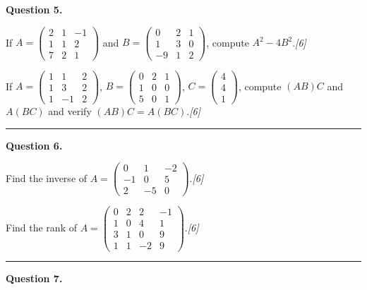 \documentclass[11pt,a4paper]{article}
\newcommand{\pts}[1]{\hfill   \textit{[#1]}}
\begin{document}
\medskip


\noindent   \textbf{Question 5.}

\begin{parts}
  \item If $A=
\begin{pmatrix}2&1&-1\\1&1&2\\7&2&1\end{pmatrix}$ and $B=
\begin{pmatrix}0&2&1\\1&3&0\\-9&1&2\end{pmatrix}$, compute $A^2-4B^2$.\pts{6}
  \item If $A=
\begin{pmatrix}1&1&2\\1&3&2\\1&-1&2\end{pmatrix}$, $B=
\begin{pmatrix}0&2&1\\1&0&0\\5&0&1\end{pmatrix}$, $C=
\begin{pmatrix}4\\4\\1\end{pmatrix}$, compute $(AB)C$ and $A(BC)$ and verify $(AB)C=A(BC)$.\pts{6}
\end{parts}
\medskip\rule{\linewidth}{0.2pt}

\medskip


\noindent   \textbf{Question 6.}

\begin{parts}
  \item Find the inverse of $A=
\begin{pmatrix}0&1&-2\\-1&0&5\\2&-5&0\end{pmatrix}$.\pts{6}
  \item Find the rank of $A=
\begin{pmatrix}0&2&2&-1\\1&0&4&1\\3&1&0&9\\1&1&-2&9\end{pmatrix}$.\pts{6}
\end{parts}
\medskip\rule{\linewidth}{0.2pt}

\medskip


\noindent   \textbf{Question 7.}
\end{document}
